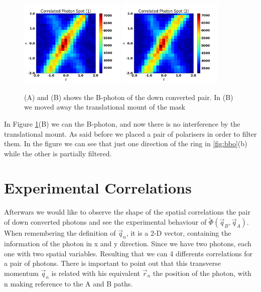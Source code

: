 \begin{figure}[h!]
\centering
{  \includegraphics[width=0.45\textwidth]{Figures/correlatedPhotonSpot1.png} }
{  \includegraphics[width=0.45\textwidth]{Figures/correlatedPhotonSpot2.png} }
\caption{(A) and (B) shows the B-photon of the down converted pair. In (B) we moved away the translational mount of the mask}
 \label{fig:correlatedPhotonSpot}
\end{figure}

In Figure \ref{fig:correlatedPhotonSpot}(B) we can the B-photon, and now there is
no interference by the translational mount. As said before we placed a pair of polarisers
in order to filter them. In the figure we can see that just one direction of the 
ring in \ref{fig:bbo}(b) while the other is partially filtered.


\section{Experimental Correlations }

Afterwars we would like to observe the shape of the spatial correlations the pair of down converted
photons and see the experimental behaviour of $\tilde{\Phi}(\vec{q}_B,\vec{q}_A)$.
When remembering the definition of $\vec{q}_n$, it is a 2-D vector, containing the information
of the photon in x and y direction. Since we have two photons, each one with two spatial 
variables. Resulting that we can 4 differents correlations for a pair of photons. There
is important to point out that this transverse momentum $\vec{q}_n$ is related with
his equivalent $\vec{r}_n$ the position of the photon, with n making reference to the A and B paths.

